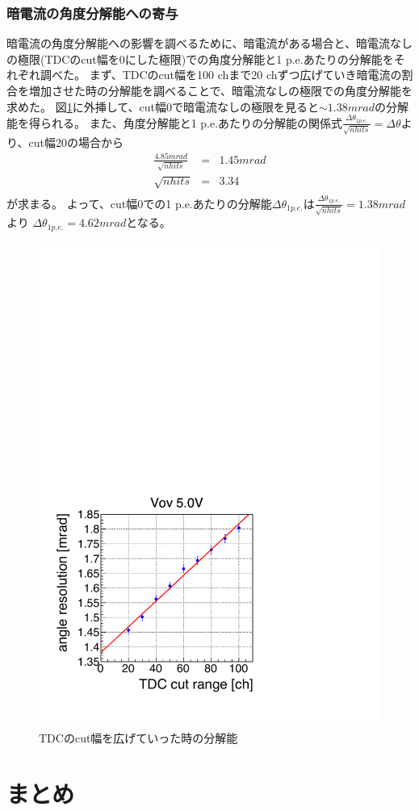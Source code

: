 \documentclass[uplatex, titlepage, dvipdfmx, 12pt, a4paper]{jsreport}
\begin{document}
    \subsection{暗電流の角度分解能への寄与}
    暗電流の角度分解能への影響を調べるために、暗電流がある場合と、暗電流なしの極限(TDCのcut幅を0にした極限)での角度分解能と1 p.e.あたりの分解能をそれぞれ調べた。
    まず、TDCのcut幅を100 chまで20 chずつ広げていき暗電流の割合を増加させた時の分解能を調べることで、暗電流なしの極限での角度分解能を求めた。
    図\ref{fig:reso_tdc}に外挿して、cut幅0で暗電流なしの極限を見ると$\sim 1.38 \si{mrad}$の分解能を得られる。
    また、角度分解能と1 p.e.あたりの分解能の関係式$\frac{\Delta \theta_{1 p.e.}}{\sqrt{nhits}}=\Delta \theta$より、cut幅20の場合から
    \begin{eqnarray}
      \frac{4.85 \si{mrad}}{\sqrt{nhits}}&=&1.45 \si{mrad} \nonumber \\
      \sqrt{nhits} &=& 3.34 \nonumber \\
    \end{eqnarray}
    が求まる。
    よって、cut幅0での1 p.e.あたりの分解能$\Delta \theta_{1 p.e.}$は$\frac{\Delta \theta_{1 p.e.}}{\sqrt{nhits}}=1.38 \si{mrad}$より
    $\Delta\theta_{1 p.e.}=4.62 \si{mrad}$となる。
    \begin{figure}[h]
      \begin{center} 
        \includegraphics[scale=0.4, clip]{image/reso_tdc.pdf}
        \caption{TDCのcut幅を広げていった時の分解能} 
        \label{fig:reso_tdc} 
      \end{center}
    \end{figure}



\chapter{まとめ}
\end{document}
